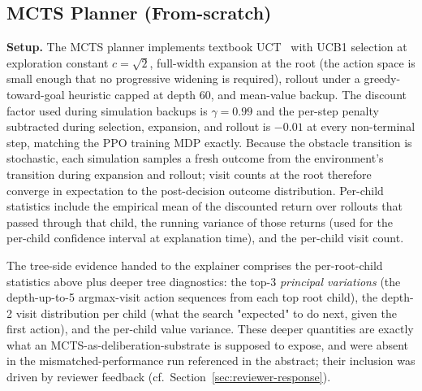\documentclass[conference]{IEEEtran}
\begin{document}
\subsection{MCTS Planner (From-scratch)}
\textbf{Setup.} The MCTS planner implements textbook
UCT~\cite{kocsis2006uct} with UCB1 selection at exploration constant
$c = \sqrt{2}$, full-width expansion at the root (the action space is
small enough that no progressive widening is required), rollout under
a greedy-toward-goal heuristic capped at depth 60, and mean-value
backup. The discount factor used during simulation backups is
$\gamma = 0.99$ and the per-step penalty subtracted during selection,
expansion, and rollout is $-0.01$ at every non-terminal step,
matching the PPO training MDP exactly. Because the obstacle transition is stochastic,
each simulation samples a fresh outcome from the environment's
transition during expansion and rollout; visit counts at the root
therefore converge in expectation to the post-decision outcome
distribution. Per-child statistics include the empirical mean of the
discounted return over rollouts that passed through that child, the
running variance of those returns (used for the per-child confidence
interval at explanation time), and the per-child visit count.

The tree-side evidence handed to the explainer comprises the
per-root-child statistics above plus deeper tree diagnostics: the
top-3 \emph{principal variations} (the depth-up-to-5 argmax-visit
action sequences from each top root child), the depth-2 visit
distribution per child (what the search "expected" to do next, given
the first action), and the per-child value variance. These deeper
quantities are exactly what an MCTS-as-deliberation-substrate is
supposed to expose, and were absent in the mismatched-performance run
referenced in the abstract; their inclusion was driven by reviewer
feedback (cf.~Section~\ref{sec:reviewer-response}).
\end{document}
